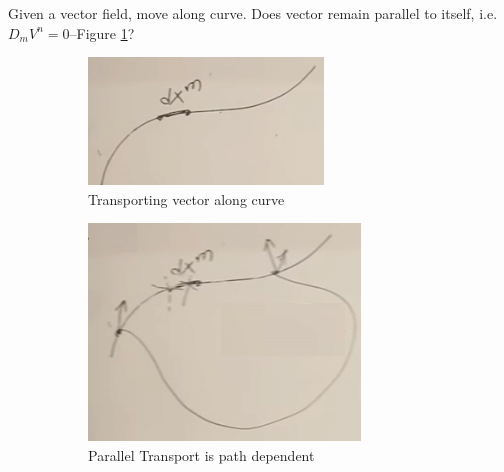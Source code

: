 \documentclass[]{article}
\begin{document}
{Given a vector field, move along curve. Does vector remain parallel to itself, i.e. $D_m V^n=0$--Figure \ref{fig:gr-4-DV-along-curve}?

\begin{figure}[H]
	\caption{Parallel Transport}
	\begin{center}
		\begin{subfigure}[t]{0.3\textwidth}
			\caption{Transporting vector along curve}\label{fig:gr-4-DV-along-curve}
			\includegraphics[width=\textwidth]{gr-4-DV-along-curve}
		\end{subfigure}
		\;
		\begin{subfigure}[t]{0.3\textwidth}
			\caption{Parallel Transport is path dependent}\label{fig:gr-4-parallel-transport-path-dependent}
			\includegraphics[width=\textwidth]{gr-4-parallel-transport-path-dependent}
		\end{subfigure}
		\;
		\begin{subfigure}[t]{0.3\textwidth}

\end{subfigure}
\end{center}
\end{figure}}
\end{document}

